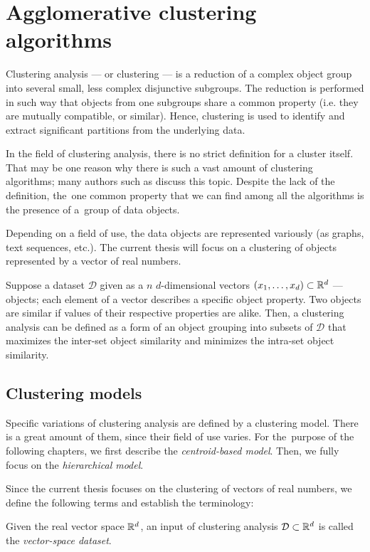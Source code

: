 \chapter{Agglomerative clustering algorithms}

Clustering analysis --- or clustering --- is a reduction of a complex object group into several small, less complex disjunctive subgroups. The reduction is performed in such way that objects from one subgroups share a common property (i.e. they are mutually compatible, or similar). Hence, clustering is used to identify and extract significant partitions from the underlying data. 

In the field of clustering analysis, there is no strict definition for a cluster itself. That may be one reason why there is such a vast amount of clustering algorithms; many authors such as \citet{estivill2002so} discuss this topic.  Despite the lack of the definition, the~one common property that we can find among all the algorithms is the presence of a~group of data objects.

Depending on a field of use, the data objects are represented variously (as graphs, text sequences, etc.). The current thesis will focus on a clustering of objects represented by a vector of real numbers.

Suppose a dataset $\mathcal{D}$ given as a $n$ $d$-dimensional vectors $(x_1,\dots,x_d) \subset \mathbb{R}^d$  --- objects; each element of a vector describes a specific object property. Two objects are similar if values of their respective properties are alike. Then, a clustering analysis can be defined as a form of an object grouping into subsets of $\mathcal{D}$ that maximizes the inter-set object similarity and minimizes the intra-set object similarity.

\section{Clustering models}

Specific variations of clustering analysis are defined by a clustering model. There is a great amount of them, since their field of use varies. For the~purpose of the following chapters, we first describe the \emph{centroid-based model}. Then, we fully focus on the \emph{hierarchical model}. 

Since the current thesis focuses on the clustering of vectors of real numbers, we define the following terms and establish the terminology:

\begin{defn}
	Given the real vector space $\mathbb{R}^d$, an input of clustering analysis $\mathcal{D}\subset\mathbb{R}^d$ is called the \emph{vector-space dataset}.
\end{defn}

